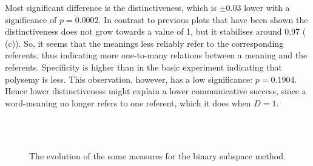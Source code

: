 \begin{description}
Most significant difference is the distinctiveness, which is $\pm 0.03$ lower with a significance of $p=0.0002$. In contrast to previous plots that have been shown the distinctiveness does not grow towards a value of 1, but it stabilises around 0.97 ( (c)). So, it seems that the meanings less reliably refer to the corresponding referents, thus indicating more one-to-many relations between a meaning and the referents. Specificity is higher than in the basic experiment indicating that polysemy is less. This observation, however, has a low significance: $p=0.1904$. Hence lower distinctiveness might explain a lower communicative success, since a word-meaning no longer refers to one referent, which it does when $D=1$.
\end{description}

\begin{figure}[t]
\centering
{}
\\
\\
\caption{The evolution of the some measures for the binary subspace method.}
\label{f:cat:bin}
\end{figure}

